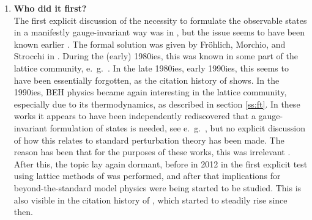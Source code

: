 \documentclass[final,twoside,12pt]{article}
\newcommand*{\1}{1\!\!\!\bot}
\begin{document}
\begin{enumerate}
 \item {\bf Who did it first?}\\
 The first explicit discussion of the necessity to formulate the observable states in a manifestly gauge-invariant way was in \cite{Banks:1979fi,'tHooft:1979bj,Frohlich:1980gj}, but the issue seems to have been known earlier \cite{Ivanov:pc,Strocchi:1977za,Osterwalder:1977pc,Englert:2004yk,Englert:2014zpa}. The formal solution was given by Fr\"ohlich, Morchio, and Strocchi in \cite{Frohlich:1980gj,Frohlich:1981yi}. During the (early) 1980ies, this was known in some part of the lattice community, e.\ g.\ \cite{Lang:pc,Shrock:1985ur,Shrock:1986av,Lee:1985yi,Olynyk:1985tr}. In the late 1980ies, early 1990ies, this seems to have been essentially forgotten, as the citation history of \cite{Frohlich:1980gj,Frohlich:1981yi} shows. In the 1990ies, BEH physics became again interesting in the lattice community, especially due to its thermodynamics, as described in section \ref{ss:ft}. In these works it appears to have been independently rediscovered that a gauge-invariant formulation of states is needed, see e.\ g.\ \cite{Karsch:1996aw,Philipsen:1996af,Philipsen:1997rq,Laine:1997nq}, but no explicit discussion of how this relates to standard perturbation theory has been made. The reason has been that for the purposes of these works, this was irrelevant \cite{Wittig:pc}. After this, the topic lay again dormant, before in 2012 in \cite{Maas:2012tj} the first explicit test using lattice methods of  \cite{Frohlich:1980gj,Frohlich:1981yi} was performed, and after that implications for beyond-the-standard model physics were being started to be studied. This is also visible in the citation history of  \cite{Frohlich:1980gj,Frohlich:1981yi}, which started to steadily rise since then.
\end{enumerate}

\itemsep -2pt


\end{document}
